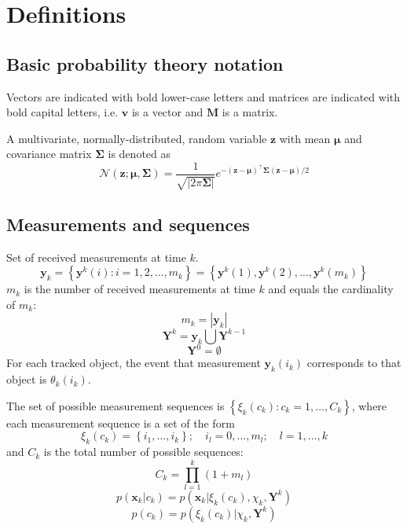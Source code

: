 \section{Definitions}
\subsection{Basic probability theory notation}
Vectors are indicated with bold lower-case letters and matrices are indicated with bold capital letters, i.e. $\mathbf v$ is a vector and $\mathbf M$ is a matrix.

A multivariate, normally-distributed, random variable $\mathbf z$ with mean $\mathbf \mu$ and covariance matrix $\mathbf \Sigma$ is denoted as
\begin{equation}
    \mathcal N(\mathbf z; \bm \mu, \mathbf \Sigma) = \frac{1}{\sqrt{|2\pi \mathbf \Sigma|}}e^{-(\mathbf z - \bm{\mu})^\intercal \mathbf \Sigma (\mathbf z - \bm \mu)/2}
\end{equation}

\subsection{Measurements and sequences}
Set of received measurements at time $k$.
\begin{equation}
    \mathbf y_k = \left\{ \mathbf y^k (i): i=1,2,\dots,m_k\right\} = \left\{ \mathbf y^k(1) , \mathbf y^k(2),\dots,\mathbf y^k(m_k)\right\}
\end{equation}
$m_k$ is the number of received measurements at time $k$ and equals the cardinality of $m_k$:
\begin{equation}
    m_k = \left| \mathbf y_k\right|
\end{equation}
\begin{equation}
    \label{eq:measurement-sequence}
    \mathbf Y^k = \mathbf y_k \bigcup \mathbf Y^{k-1}
\end{equation}
\begin{equation}
    \mathbf Y^0 = \emptyset
\end{equation}
For each tracked object, the event that measurement $\mathbf y_k(i_k)$ corresponds to that object is $\theta_k(i_k)$.

The set of possible measurement sequences is $\left\{ \xi_k(c_k): c_k = 1,\dots,C_k\right\}$, where each measurement sequence is a
set of the form
\begin{equation}
    \xi_k(c_k) = \left\{ i_1, \dots, i_k \right\};\quad i_l = 0,\dots, m_l;\quad l = 1,\dots, k
\end{equation}
and $C_k$ is the total number of possible sequences:
\begin{equation}
    C_k = \prod^k_{l=1}(1+m_l)
\end{equation}
\begin{equation}
    p(\mathbf x_k | c_k) = p(\mathbf x_k| \xi_k(c_k),\chi_k, \mathbf Y^k)
\end{equation}
\begin{equation}
    p(c_k) = p(\xi_k(c_k)|\chi_k, \mathbf Y^k)
\end{equation}

